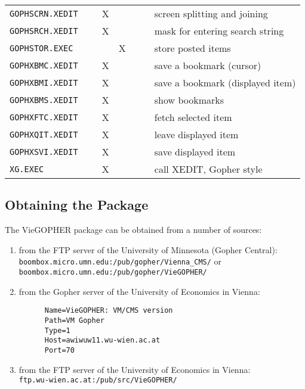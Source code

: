 \begin{appendix}
\begin{footnotesize}
\begin{tabular}{|l||c|c|c|c|c||l|}
{\tt GOPHSCRN.XEDIT   } &   &X &   &   &   &screen splitting and joining    \\
{\tt GOPHSRCH.XEDIT   } &   &X &   &   &   &mask for entering search string \\
{\tt GOPHSTOR.EXEC    } &   &  & X &   &   &store posted items              \\
\hline
{\tt GOPHXBMC.XEDIT   } &   &X &   &   &   &save a bookmark (cursor)        \\
{\tt GOPHXBMI.XEDIT   } &   &X &   &   &   &save a bookmark (displayed item)\\
{\tt GOPHXBMS.XEDIT   } &   &X &   &   &   &show bookmarks                  \\
{\tt GOPHXFTC.XEDIT   } &   &X &   &   &   &fetch selected item             \\
{\tt GOPHXQIT.XEDIT   } &   &X &   &   &   &leave displayed item            \\
{\tt GOPHXSVI.XEDIT   } &   &X &   &   &   &save displayed item             \\
\hline
{\tt XG.EXEC          } &   &X &   &   &   &call XEDIT, Gopher style        \\
\hline
\end{tabular}
\end{footnotesize}



\subsection{Obtaining the Package}\label{sources}

The VieGOPHER package can be obtained from a number of sources:
\begin{enumerate}
\item from the FTP server of the University of Minnesota (Gopher Central):\\
      {\tt boombox.micro.umn.edu:/pub/gopher/Vienna\_CMS/} or\\
      {\tt boombox.micro.umn.edu:/pub/gopher/VieGOPHER/}
\item from the Gopher server of the University of Economics in Vienna:
      \begin{verbatim}
      Name=VieGOPHER: VM/CMS version
      Path=VM Gopher
      Type=1
      Host=awiwuw11.wu-wien.ac.at
      Port=70
      \end{verbatim}
\item from the FTP server of the University of Economics in Vienna:\\
      {\tt ftp.wu-wien.ac.at:/pub/src/VieGOPHER/}
\end{enumerate}




\end{appendix}
